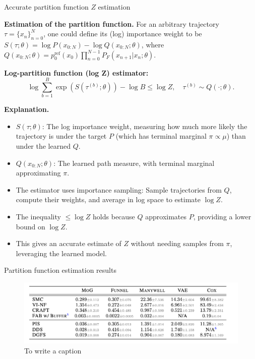 \documentclass[aspectratio=169,xcolor=dvipsnames]{beamer}
\begin{document}
\begin{frame}[t]{Accurate partition function $Z$ estimation}
\footnotesize

\textbf{Estimation of the partition function.} For an arbitrary trajectory $\tau = \{x_n\}_{n=0}^N$, one could define its (log) importance weight to be $S(\tau; \theta) = \log P(x_{0:N}) - \log Q(x_{0:N}; \theta)$, where $Q(x_{0:N}; \theta) = p^{\text{ref}}_0(x_0) \prod_{n=0}^{N-1} P_F(x_{n+1}|x_n; \theta)$.

\textbf{Log-partition function (log Z) estimator:}
\[
\log \sum_{b=1}^B \exp(S(\tau^{(b)}; \theta)) - \log B \leq \log Z, \quad \tau^{(b)} \sim Q(\cdot; \theta).
\]

\textbf{Explanation.}
\begin{itemize}\itemsep2pt
  \item $S(\tau; \theta)$: The log importance weight, measuring how much more likely the trajectory is under the target $P$ (which has terminal marginal $\pi \propto \mu$) than under the learned $Q$.
  \item $Q(x_{0:N}; \theta)$: The learned path measure, with terminal marginal approximating $\pi$.
  \item The estimator uses importance sampling: Sample trajectories from $Q$, compute their weights, and average in log space to estimate $\log Z$.
  \item The inequality $\leq \log Z$ holds because $Q$ approximates $P$, providing a lower bound on $\log Z$.
  \item This gives an accurate estimate of $Z$ without needing samples from $\pi$, leveraging the learned model.
\end{itemize}

\end{frame}

\begin{frame}[t]{Partition function estimation results}
\footnotesize

\begin{figure}
    \centering
    \includegraphics[width=1.025\textwidth]{figures/partition_fnct.png}
    \caption{To write a caption}
\end{figure}

\end{frame}
\end{document}
